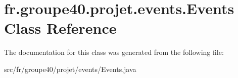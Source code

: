 \hypertarget{classfr_1_1groupe40_1_1projet_1_1events_1_1_events}{}\section{fr.\+groupe40.\+projet.\+events.\+Events Class Reference}
\label{classfr_1_1groupe40_1_1projet_1_1events_1_1_events}


The documentation for this class was generated from the following file\+:\begin{DoxyCompactItemize}
\item 
src/fr/groupe40/projet/events/Events.\+java\end{DoxyCompactItemize}
